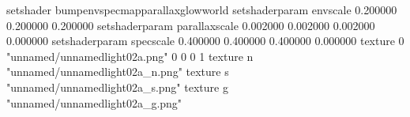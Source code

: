 setshader bumpenvspecmapparallaxglowworld
setshaderparam envscale 0.200000 0.200000 0.200000
setshaderparam parallaxscale 0.002000 0.002000 0.002000 0.000000
setshaderparam specscale 0.400000 0.400000 0.400000 0.000000
texture 0 "unnamed/unnamedlight02a.png" 0 0 0 1
texture n "unnamed/unnamedlight02a_n.png"
texture s "unnamed/unnamedlight02a_s.png"
texture g "unnamed/unnamedlight02a_g.png"